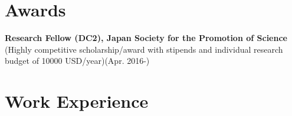 \documentclass[letterpaper,12pt]{article}
\begin{document}
\renewcommand{\refname}{Recent Publications \& Presentations}

{
\let\uline\relax
\nocite{Asai2017b}
\nocite{Asai2017}
\nocite{Asai2016b}
\nocite{Asai2016}
\nocite{Asai2015}
\nocite{Asai2014}




}

\section{Awards}

\textbf{Research Fellow (DC2), Japan Society for the Promotion of Science} (Highly competitive scholarship/award with stipends and individual research budget of 10000 USD/year)(Apr. 2016-)



\section{Work Experience}
\end{document}
